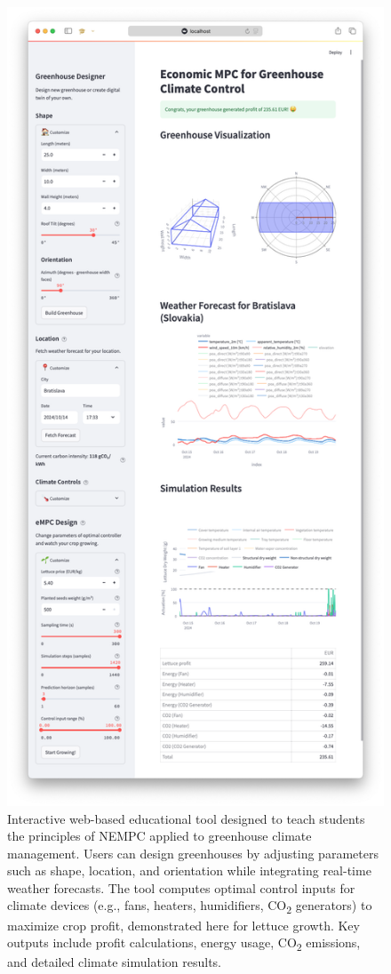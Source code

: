 \documentclass[conference]{IEEEtran}
\begin{document}
\begin{figure}\label{fig:web}
    \centering
    \includegraphics[width=.5\textwidth]{figures/webpage.png}
    \caption{Interactive web-based educational tool designed to teach students the principles of NEMPC applied to greenhouse climate management. Users can design greenhouses by adjusting parameters such as shape, location, and orientation while integrating real-time weather forecasts. The tool computes optimal control inputs for climate devices (e.g., fans, heaters, humidifiers, CO\textsubscript{2} generators) to maximize crop profit, demonstrated here for lettuce growth. Key outputs include profit calculations, energy usage, CO\textsubscript{2} emissions, and detailed climate simulation results.}
\end{figure}
\end{document}
